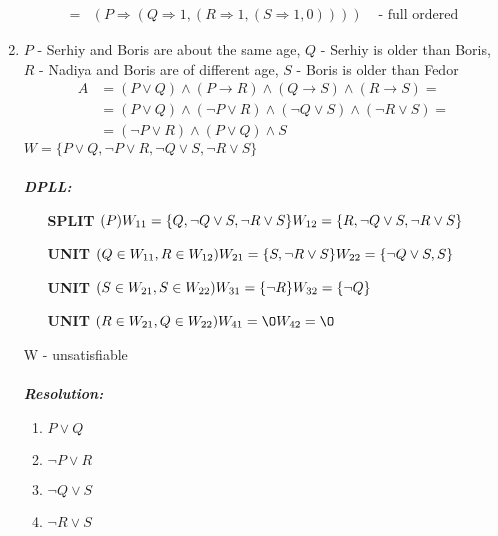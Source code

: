 \documentclass[a4paper,12pt]{article}
\begin{document}
\begin{enumerate}
\begin{align*}
		=&(P\Rightarrow(Q\Rightarrow1,(R\Rightarrow1,(S\Rightarrow1,0))))&\textrm{ - full ordered}
	\end{align*}
	\item 
	$P$ - Serhiy and Boris are about the same age, $Q$ - Serhiy is older than Boris, $R$ - Nadiya and Boris are of different age, $S$ - Boris is older than Fedor
	\begin{align*}
		A&=(P\lor Q)\land(P\to R)\land(Q\to S)\land (R\to S)=\\&=(P\lor Q)\land(\neg P\lor R)\land(\neg Q\lor S)\land (\neg R\lor S)=\\&=(\neg P\lor R)\land(P\lor Q)\land S
	\end{align*}
	$W=\{P\lor Q,\neg P\lor R,\neg Q\lor S,\neg R\lor S\}$
	\\\\\emph{\textbf{DPLL:}}\\
	\begin{itemize}
		\item [\textbf{SPLIT}] $(P)\\W_{11}=\{Q,\neg Q\lor S,\neg R\lor S\}\\W_{12}=\{R,\neg Q\lor S,\neg R\lor S\}$
		\item [\textbf{UNIT}] $(Q\in W_{11},R\in W_{12})\\W_{21}=\{S,\neg R\lor S\}\\W_{22}=\{\neg Q\lor S,S\}$
		\item [\textbf{UNIT}] $(S\in W_{21},S\in W_{22})\\W_{31}=\{\neg R\}\\W_{32}=\{\neg Q\}$
		\item [\textbf{UNIT}] $(R\in W_{21},Q\in W_{22})\\W_{41}=\O\\W_{42}=\O$
	\end{itemize}
	W - unsatisfiable
	\\\\\emph{\textbf{Resolution:}}\\
	\begin{multicols}{4}
		\begin{enumerate}[(1)]
			\item $P\lor Q$
			\item $\neg P\lor R$
			\item $\neg Q\lor S$
			\item $\neg R\lor S$
		\end{enumerate}
	\end{multicols}
	\begin{multicols}{2}

\end{multicols}
\end{enumerate}
\end{document}
